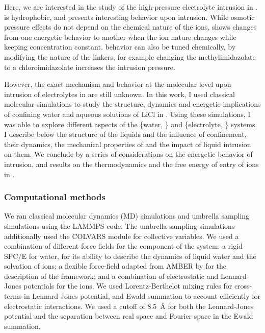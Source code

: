 \documentclass[thesis]{subfiles}
\begin{document}
Here, we are interested in the study of the high-pressure electrolyte intrusion
in .  is hydrophobic\cite{AOrtiz2014}, and presents interesting
behavior upon intrusion. While osmotic pressure effects do not depend on the
chemical nature of the ions,  shows changes from one energetic behavior to
another when the ion nature changes while keeping concentration
constant\cite{Ortiz2014}.  behavior can also be tuned chemically, by
modifying the nature of the linkers, for example changing the methylimidazolate
to a chloroimidazolate increases the intrusion pressure\cite{Mortada2018}.

However, the exact mechanism and behavior at the molecular level upon intrusion
of electrolytes in  are still unknown. In this work, I used classical
molecular simulations to study the structure, dynamics and energetic
implications of confining water and aqueous solutions of LiCl in . Using
these simulations, I was able to explore different aspects of the \{water,
\} and \{electrolyte, \} systems. I describe below the structure of
the liquids and the influence of confinement, their dynamics, the mechanical
properties of  and the impact of liquid intrusion on them. We conclude by a
series of considerations on the energetic behavior of intrusion, and results on
the thermodynamics and the free energy of entry of ions in .

\subsubsection{Computational methods}

We ran classical molecular dynamics (MD) simulations and umbrella sampling
simulations using the LAMMPS\cite{Plimpton1993} code. The umbrella sampling
simulations additionally used the COLVARS\cite{Fiorin2013} module for collective
variables. We used a combination of different force fields for the component of
the system: a rigid SPC/E\cite{Berendsen1987} for water, for its ability to
describe the dynamics of liquid water and the solvation of ions; a flexible
force-field adapted from AMBER by \citeauthor{Zheng2012}\cite{Zheng2012} for the
description of the  framework; and a combination of electrostatic and
Lennard-Jones potentials for the ions\cite{Chowdhuri2003}. We used
Lorentz-Berthelot mixing rules for cross-terms in Lennard-Jones potential, and
Ewald summation to account efficiently for electrostatic interactions. We used a
cutoff of \SI{8.5}{\angstrom} for both the Lennard-Jones potential and the
separation between real space and Fourier space in the Ewald summation.
\end{document}
